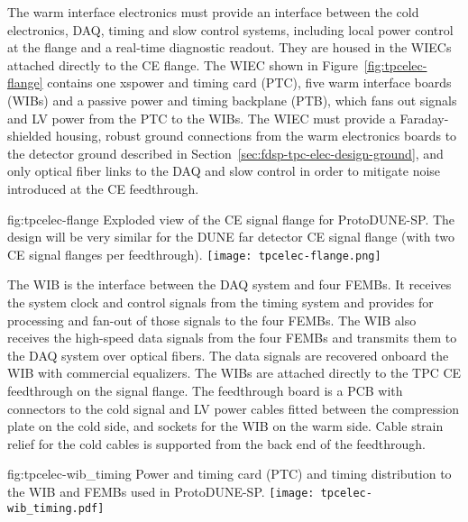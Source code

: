 The warm interface electronics must provide an interface between the cold electronics, DAQ, timing and slow control systems, including local power control at the flange and a real-time diagnostic readout. They are housed in the WIECs attached directly to the CE flange.  The WIEC shown in Figure~\ref{fig:tpcelec-flange} 
contains one xspower and timing card (PTC), five warm interface boards (WIBs) and a passive
power and timing backplane (PTB), which fans out signals and LV power from the PTC to the WIBs. The WIEC must provide a Faraday-shielded housing, robust ground connections from the warm electronics boards to the detector ground described in Section~\ref{sec:fdsp-tpc-elec-design-ground}, and only optical fiber links to the DAQ and slow control in order to mitigate noise introduced at the CE feedthrough.

\begin{dunefigure}
{fig:tpcelec-flange}
{Exploded view of the CE signal flange for ProtoDUNE-SP.  The design will be very similar for the DUNE far detector CE signal flange (with two CE signal flanges per feedthrough).}
\texttt{[image: tpcelec-flange.png]}
\end{dunefigure}

The WIB is the interface between the DAQ system and four
FEMBs. It receives the system clock and control signals from the
timing system and provides for processing and fan-out of those signals to the four
FEMBs. The WIB also receives the high-speed data signals from the four 
FEMBs and transmits them to the DAQ system over optical
fibers. The data signals are recovered onboard the WIB with commercial equalizers.
The WIBs are attached directly to the TPC
CE feedthrough on the signal flange. The feedthrough
board is a PCB with connectors to the cold signal and LV power cables fitted
between the compression plate on the cold side, and sockets for
the WIB on the warm side. Cable strain relief for the cold cables is 
supported from the back end of the feedthrough.

\begin{dunefigure}
{fig:tpcelec-wib_timing}
{Power and timing card (PTC) and timing distribution to the WIB and FEMBs used in ProtoDUNE-SP.}
\texttt{[image: tpcelec-wib\_timing.pdf]}
\end{dunefigure}

